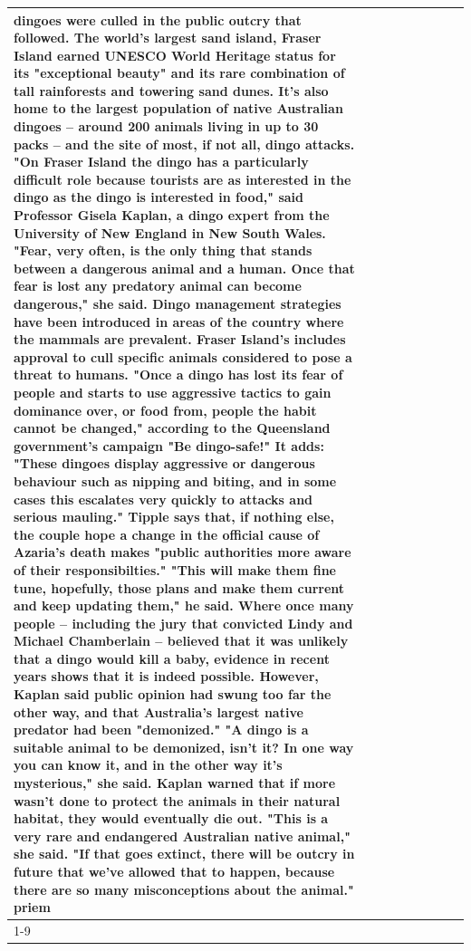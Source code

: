 \begin{table}[H]
\begin{tabular}{lllrlllll}
dingoes were culled in the public outcry that followed. The world's largest sand island, Fraser Island earned UNESCO World Heritage status for its "exceptional beauty" and its rare combination of tall rainforests and towering sand dunes. It's also home to the largest population of native Australian dingoes -- around 200 animals living in up to 30 packs -- and the site of most, if not all, dingo attacks. "On Fraser Island the dingo has a particularly difficult role because tourists are as interested in the dingo as the dingo is interested in food," said Professor Gisela Kaplan, a dingo expert from the University of New England in New South Wales. "Fear, very often, is the only thing that stands between a dangerous animal and a human. Once that fear is lost any predatory animal can become dangerous," she said. Dingo management strategies have been introduced in areas of the country where the mammals are prevalent. Fraser Island's includes approval to cull specific animals considered to pose a threat to humans. "Once a dingo has lost its fear of people and starts to use aggressive tactics to gain dominance over, or food from, people the habit cannot be changed," according to the Queensland government's campaign "Be dingo-safe!" It adds: "These dingoes display aggressive or dangerous behaviour such as nipping and biting, and in some cases this escalates very quickly to attacks and serious mauling." Tipple says that, if nothing else, the couple hope a change in the official cause of Azaria's death makes "public authorities more aware of their responsibilties." "This will make them fine tune, hopefully, those plans and make them current and keep updating them," he said. Where once many people -- including the jury that convicted Lindy and Michael Chamberlain -- believed that it was unlikely that a dingo would kill a baby, evidence in recent years shows that it is indeed possible. However, Kaplan said public opinion had swung too far the other way, and that Australia's largest native predator had been "demonized." "A dingo is a suitable animal to be demonized, isn't it? In one way you can know it, and in the other way it's mysterious," she said. Kaplan warned that if more wasn't done to protect the animals in their natural habitat, they would eventually die out. "This is a very rare and endangered Australian native animal," she said. "If that goes extinct, there will be outcry in future that we've allowed that to happen, because there are so many misconceptions about the animal." priem \\
\cline{1-9}

\end{tabular}
\end{table}
